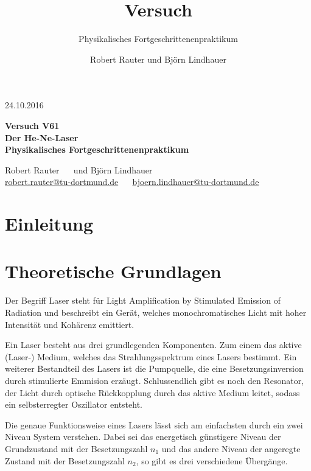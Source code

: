 \documentclass[]{scrartcl}
\title{Versuch \versuchnummer\\ \versuchname}
\subtitle{Physikalisches Fortgeschrittenenpraktikum}
\author{Robert Rauter und Björn Lindhauer}
\date{\versuchdatum}
\newcommand{\versuchnummer}{V61}
\newcommand{\versuchname}{Der He-Ne-Laser}
\newcommand{\versuchdatum}{24.10.2016}
\begin{document}
\begin{titlepage}
{\large \versuchdatum}
\vspace{7cm}
\begin{center}
\textbf{\huge Versuch \versuchnummer}\\\vspace{0.5cm}
\textbf{\huge \versuchname}\\
\vspace{0.2cm}
\textbf{ Physikalisches Fortgeschrittenenpraktikum}\\
\vspace{9cm}

{\Large Robert Rauter \ \ \hspace{1.5cm} und \hspace{1.5cm} Björn Lindhauer}\\
{ \url{robert.rauter@tu-dortmund.de} \ \ \hspace{2cm} \url{bjoern.lindhauer@tu-dortmund.de}}
\end{center}
\end{titlepage}
\section{Einleitung}

\section{Theoretische Grundlagen}
Der Begriff Laser steht für Light Amplification by Stimulated Emission of Radiation und beschreibt ein Gerät, welches monochromatisches Licht mit hoher Intensität und Kohärenz emittiert.

Ein Laser besteht aus drei grundlegenden Komponenten. Zum einem das aktive (Laser-) Medium, welches das Strahlungsspektrum eines Lasers bestimmt.
Ein weiterer Bestandteil des Lasers ist die Pumpquelle, die eine Besetzungsinversion durch stimulierte Emmision erzäugt. 
Schlussendlich gibt es noch den Resonator, der Licht durch optische Rückkopplung durch das aktive Medium leitet, sodass ein selbsterregter Oszillator entsteht.

Die genaue Funktionsweise eines Lasers lässt sich am einfachsten durch ein zwei Niveau System verstehen. 
Dabei sei das energetisch günstigere Niveau der Grundzustand mit der Besetzungszahl $n_1$ und das andere Niveau der angeregte Zustand mit der Besetzungszahl $n_2$, so gibt es drei verschiedene Übergänge.
\end{document}
